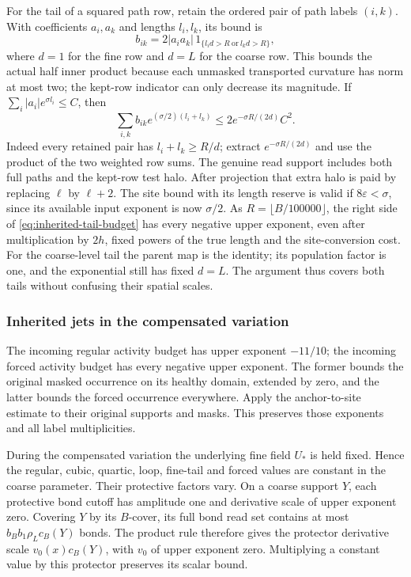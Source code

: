 For the tail of a squared path row, retain the ordered pair of
path labels $(i,k)$. With coefficients $a_i,a_k$ and lengths
$l_i,l_k$, its bound is
\[
 b_{ik}=2|a_i a_k|\,
       1_{\{l_i d>R\ \mathrm{or}\ l_k d>R\}},
\]
where $d=1$ for the fine row and $d=L$ for the coarse row.
This bounds the actual half inner product because each unmasked
transported curvature has norm at most two; the kept-row
indicator can only decrease its magnitude. If
$\sum_i|a_i|e^{\sigma l_i}\le C$, then
\begin{equation}\label{eq:inherited-tail-budget}
 \sum_{i,k}b_{ik}e^{(\sigma/2)(l_i+l_k)}
 \le2e^{-\sigma R/(2d)}C^2.
\end{equation}
Indeed every retained pair has $l_i+l_k\ge R/d$; extract
$e^{-\sigma R/(2d)}$ and use the product of the two weighted
row sums. The genuine read support includes both full paths and
the kept-row test halo. After projection that extra halo is paid
by replacing $\ell$ by $\ell+2$. The site bound with its length
reserve is valid if $8\varepsilon<\sigma$, since its available
input exponent is now $\sigma/2$. As $R=\lfloor B/100000\rfloor$,
the right side of \eqref{eq:inherited-tail-budget} has every
negative upper exponent, even after multiplication by $2h$,
fixed powers of the true length and the site-conversion cost.
For the coarse-level tail the parent map is the identity; its
population factor is one, and the exponential still has fixed
$d=L$. The argument thus covers both tails without confusing
their spatial scales.

\subsubsection{Inherited jets in the compensated variation}
The incoming regular activity budget has upper exponent $-11/10$;
the incoming forced activity budget has every negative upper
exponent. The former bounds the original masked occurrence on
its healthy domain, extended by zero, and the latter bounds the
forced occurrence everywhere. Apply the anchor-to-site estimate
to their original supports and masks. This preserves those
exponents and all label multiplicities.

During the compensated variation the underlying fine field $U_*$
is held fixed. Hence the regular, cubic, quartic, loop, fine-tail
and forced values are constant in the coarse parameter. Their
protective factors vary. On a coarse support $Y$, each protective
bond cutoff has amplitude one and derivative scale of upper
exponent zero. Covering $Y$ by its $B$-cover, its full bond read
set contains at most
$b_B b_1\rho_L c_B(Y)$ bonds. The product rule therefore gives
the protector derivative scale $v_0(x)c_B(Y)$, with $v_0$ of
upper exponent zero. Multiplying a constant value by this
protector preserves its scalar bound.

